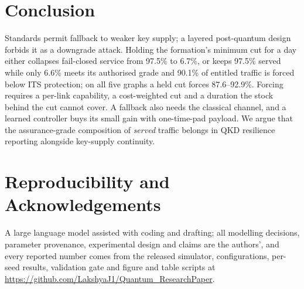 \documentclass[conference,a4paper]{IEEEtran}
\begin{document}
\section{Conclusion}
Standards permit fallback to weaker key supply; a layered post-quantum design
forbids it as a downgrade attack. Holding the formation's minimum cut for a day
either collapses fail-closed service from 97.5\% to 6.7\%, or keeps 97.5\% served
while only 6.6\% meets its authorised grade and 90.1\% of entitled traffic is forced
below ITS protection; on all five graphs a held cut forces 87.6--92.9\%. Forcing requires a per-link capability, a cost-weighted cut and a duration the stock behind the cut cannot cover. A fallback also needs the classical channel, and a learned controller buys its small gain with one-time-pad payload. We argue that the assurance-grade composition of \emph{served} traffic belongs in QKD resilience reporting alongside key-supply continuity.

\section*{Reproducibility and Acknowledgements}
A large language model assisted with coding and drafting; all modelling decisions,
parameter provenance, experimental design and claims are the authors', and every
reported number comes from the released simulator, configurations, per-seed results,
validation gate and figure and table scripts at
\url{https://github.com/LakshyaJ1/Quantum_ResearchPaper}.
\end{document}
